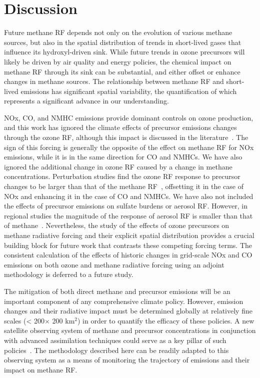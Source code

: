 \section{Discussion}

Future methane RF depends not only on the evolution of various methane sources, but also in the spatial distribution of trends in short-lived gases that influence its hydroxyl-driven sink. While future trends in ozone precursors will likely be driven by air quality and energy policies, the chemical impact on methane RF through its sink can be substantial, and either offset or enhance changes in methane sources. The relationship between methane RF and short-lived emissions has significant spatial variability, the quantification of which represents a significant advance in our understanding.

NOx, CO, and NMHC emissions provide dominant controls on ozone production, and this work has ignored the climate effects of precursor emissions changes through the ozone RF, although this impact is discussed in the literature~\citep{ref:naik2005,ref:bowman2012,ref:shindell2013}. The sign of this forcing is generally the opposite of the effect on methane RF for NOx emissions, while it is in the same direction for CO and NMHCs. We have also ignored the additional change in ozone RF caused by a change in methane concentrations. Perturbation studies find the ozone RF response to precursor changes to be larger than that of the methane RF~\citep{ref:akimoto2015}, offsetting it in the case of NOx and enhancing it in the case of CO and NMHCs. We have also not included the effects of precursor emissions on sulfate burdens or aerosol RF. However, in regional studies the magnitude of the response of aerosol RF is smaller than that of methane~\citep{ref:fry2012}. Nevertheless, the study of the effects of ozone precursors on methane radiative forcing and their explicit spatial distribution provides a crucial building block for future work that contrasts these competing forcing terms. The consistent calculation of the effects of historic changes in grid-scale NOx and CO emissions on both ozone and methane radiative forcing using an adjoint methodology is deferred to a future study.

The mitigation of both direct methane and precursor emissions will be an important component of any comprehensive climate policy.  However, emission changes and their radiative impact must be determined globally at relatively fine scales (< 200$\times$ 200 km$^2$) in order to quantify the efficacy of these policies.  A new satellite observing system of methane and precursor concentrations in conjunction with advanced assimilation techniques could serve as a key pillar of such policies~\cite{bowman:2013kx}. The methodology described here can be readily adapted to this observing system as a means of monitoring the trajectory of emissions and their impact on methane RF.  

